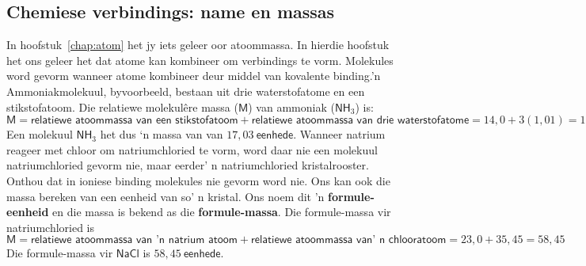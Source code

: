             \subsection*{Chemiese verbindings: name en massas}
            \nopagebreak
\label{m38689*uid97124}In hoofstuk~\ref{chap:atom} het jy iets geleer oor atoommassa. In hierdie hoofstuk het ons geleer het dat atome kan kombineer om verbindings te vorm. Molekules word gevorm wanneer atome kombineer deur middel van kovalente binding.’n Ammoniakmolekuul, byvoorbeeld, bestaan ​​uit drie waterstofatome en een stikstofatoom. Die relatiewe molekul\^{e}re massa ($\textsf{M}$) van ammoniak ($\textsf{NH}_{3}$) is:\\
\begin{equation*}
 \textsf{M} = \textsf{relatiewe atoommassa van een stikstofatoom} + \textsf{relatiewe atoommassa van drie waterstofatome}
= 14,0 + 3(1,01) 
= 17,03
\end{equation*}
Een molekuul $\textsf{NH}_{3}$ het dus ‘n massa van van $17,03~\textsf{eenhede}$. Wanneer natrium reageer met chloor om natriumchloried te vorm, word daar nie een molekuul natriumchloried gevorm nie, maar eerder' n natriumchloried kristalrooster. Onthou dat in ioniese binding molekules nie gevorm word nie. Ons kan ook die massa bereken van een eenheid van so' n kristal. Ons noem dit 'n \textbf{formule-eenheid} en die massa is bekend as die \textbf{formule-massa}. Die formule-massa vir natriumchloried is
 \begin{equation*}
 \textsf{M} = \textsf{relatiewe atoommassa van 'n natrium atoom} + \textsf{relatiewe atoommassa van' n chlooratoom}
= 23,0 + 35,45 
= 58,45
\end{equation*} 
Die formule-massa vir $\textsf{NaCl}$ is $58,45~\textsf{eenhede}$.
      \label{m38689*secfhsst!!!underscore!!!id822}
